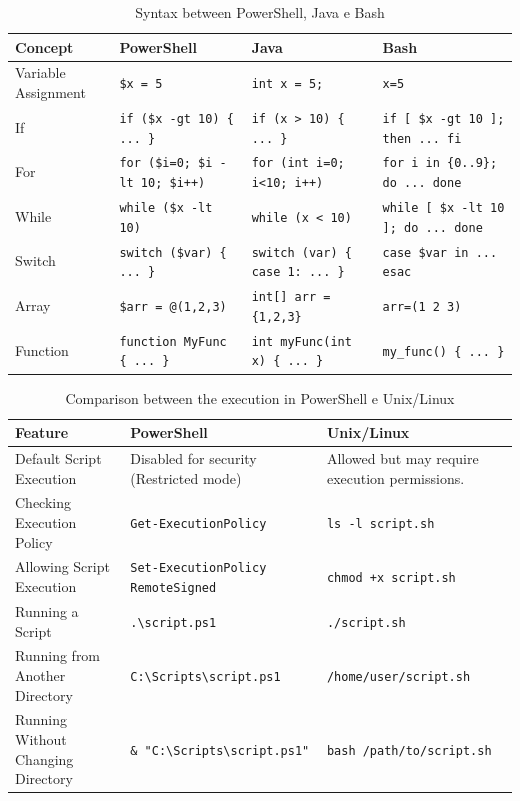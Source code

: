 \documentclass[a4paper]{article}
\begin{document}
\begin{table}[h]
 \hspace{-2cm}
\renewcommand{\arraystretch}{1.2} %
\begin{tabular}{|p{3cm}|p{4cm}|p{4cm}|p{3cm}|}
    \hline
    \textbf{Concept	} & \textbf{PowerShell} & \textbf{Java} & \textbf{Bash} \\
    \hline
    Variable Assignment & \texttt{\$x = 5} & \texttt{int x = 5;} & \texttt{x=5} \\
    \hline
    If & \texttt{if (\$x -gt 10) \{ ... \}} & \texttt{if (x > 10) \{ ... \}} & \texttt{if [ \$x -gt 10 ]; then ... fi} \\
    \hline
    For & \texttt{for (\$i=0; \$i -lt 10; \$i++)} & \texttt{for (int i=0; i<10; i++)} & \texttt{for i in \{0..9\}; do ... done} \\
    \hline
    While & \texttt{while (\$x -lt 10)} & \texttt{while (x < 10)} & \texttt{while [ \$x -lt 10 ]; do ... done} \\
    \hline
    Switch & \texttt{switch (\$var) \{ ... \}} & \texttt{switch (var) \{ case 1: ... \}} & \texttt{case \$var in ... esac} \\
    \hline
    Array & \texttt{\$arr = @(1,2,3)} & \texttt{int[] arr = \{1,2,3\}} & \texttt{arr=(1 2 3)} \\
    \hline
    Function & \texttt{function MyFunc \{ ... \}} & \texttt{int myFunc(int x) \{ ... \}} & \texttt{my\_func() \{ ... \}} \\
    \hline
\end{tabular}
\caption{Syntax between PowerShell, Java e Bash}
\end{table}
\begin{table}[h]
\hspace{-1.5cm}
\renewcommand{\arraystretch}{1.2}
\begin{tabular}{|p{3.5cm}|p{5cm}|p{5cm}|}
    \hline
    \textbf{Feature} & \textbf{PowerShell} & \textbf{Unix/Linux} \\
    \hline
    Default Script Execution & Disabled for security (Restricted mode) & Allowed but may require execution permissions. \\
    \hline
    Checking Execution Policy & \texttt{Get-ExecutionPolicy} & \texttt{ls -l script.sh} \\
    \hline
    Allowing Script Execution & \texttt{Set-ExecutionPolicy RemoteSigned} & \texttt{chmod +x script.sh} \\
    \hline
    Running a Script & \texttt{.\textbackslash script.ps1} & \texttt{./script.sh} \\
    \hline
    Running from Another Directory & \texttt{C:\textbackslash Scripts\textbackslash script.ps1} & \texttt{/home/user/script.sh} \\
    \hline
    Running Without Changing Directory & \texttt{\& "C:\textbackslash Scripts\textbackslash script.ps1"} & \texttt{bash /path/to/script.sh} \\
    \hline
\end{tabular}
\caption{Comparison between the execution in PowerShell e Unix/Linux}
\end{table}
\end{document}
